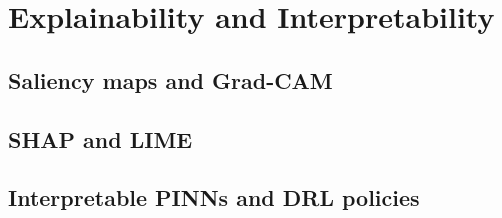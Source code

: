 ﻿\chapter{Explainability and Interpretability}
\section{Saliency maps and Grad-CAM}

\section{SHAP and LIME}

\section{Interpretable PINNs and DRL policies}


